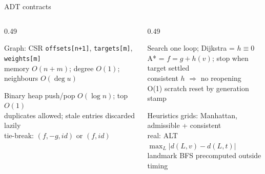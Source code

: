 \documentclass[aspectratio=169,10pt]{beamer}
\begin{document}
\begin{frame}{ADT contracts}
  \begin{columns}[T,onlytextwidth]
    \begin{column}{0.49\textwidth}
      \begin{block}{Graph: CSR}
        \texttt{offsets[n+1]}, \texttt{targets[m]}, \texttt{weights[m]}\\
        memory $O(n+m)$; degree $O(1)$; neighbours $O(\deg u)$
      \end{block}
      \begin{block}{Binary heap}
        push/pop $O(\log n)$; top $O(1)$\\
        duplicates allowed; stale entries discarded lazily\\
        tie-break: $(f,-g,id)$ or $(f,id)$
      \end{block}
    \end{column}
    \begin{column}{0.49\textwidth}
      \begin{block}{Search}
        one loop; Dijkstra = $h\equiv0$\\
        A* = $f=g+h(v)$; stop when target settled\\
        consistent $h$ $\Rightarrow$ no reopening\\
        O(1) scratch reset by generation stamp
      \end{block}
      \begin{block}{Heuristics}
        grids: Manhattan, admissible + consistent\\
        real: ALT $\max_L |d(L,v)-d(L,t)|$\\
        landmark BFS precomputed outside timing
      \end{block}
    \end{column}
  \end{columns}
\end{frame}
\end{document}
